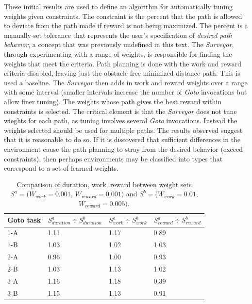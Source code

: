 \documentclass{tamuccthesis}
\begin{document}
These initial results are used to define an algorithm for automatically tuning weights given constraints. The constraint is the percent that the path is allowed to deviate from the path made if reward is not being maximized. The percent is a manually-set tolerance that represents the user's specification of \textit{desired path behavior}, a concept that was previously undefined in this text. The \textit{Surveyor}, through experimenting with a range of weights, is responsible for finding the weights that meet the criteria. Path planning is done with the work and reward criteria disabled, leaving just the obstacle-free minimized distance path. This is used a baseline. The \textit{Surveyor} then adds in work and reward weights over a range with some interval (smaller intervals increase the number of \textit{Goto} invocations but allow finer tuning). The weights whose path gives the best reward within constraints is selected. The critical element is that the \textit{Surveyor} does not tune wieghts for each path, as tuning involves several \textit{Goto} invocations. Instead the weights selected should be used for multiple paths. The results observed suggest that it is reasonable to do so. If it is discovered that sufficient differences in the environment cause the path planning to stray from the desired behavior (exceed constraints), then perhaps environments may be classified into types that correspond to a set of learned weights. 

\begin{table}[H]
    \begin{tabular}{|l|l|l|l|}
        \hline
        Goto task & $S^a_{duration} \div S^b_{duration}$ & $S^a_{work} \div S^b_{work}$ & $S^a_{reward} \div S^b_{reward}$ \\
        \hline
        1-A & 1.11 & 1.17 & 0.89 \\
        \hline
        1-B & 1.03 & 1.02 & 1.03 \\
        \hline
        2-A & 0.96 & 1.00 & 0.93 \\
        \hline
        2-B & 1.03 & 1.13 & 1.02 \\
        \hline
        3-A & 1.16 & 1.18 & 0.39 \\
        \hline
        3-B &  1.15 & 1.13 & 0.91 \\
        \hline
    \end{tabular}
    \caption[Varying optimization criteria weights, weight sets $S^a$ and $S^b$.]{Comparison of duration, work, reward between weight sets $S^a = (W_{work} = 0.001$, $W_{reward} = 0.001)$ and $S^b = (W_{work} = 0.01$, $W_{reward} = 0.005)$.}
    \label{tbl:weightDiff_a_b}
\end{table}
\end{document}
